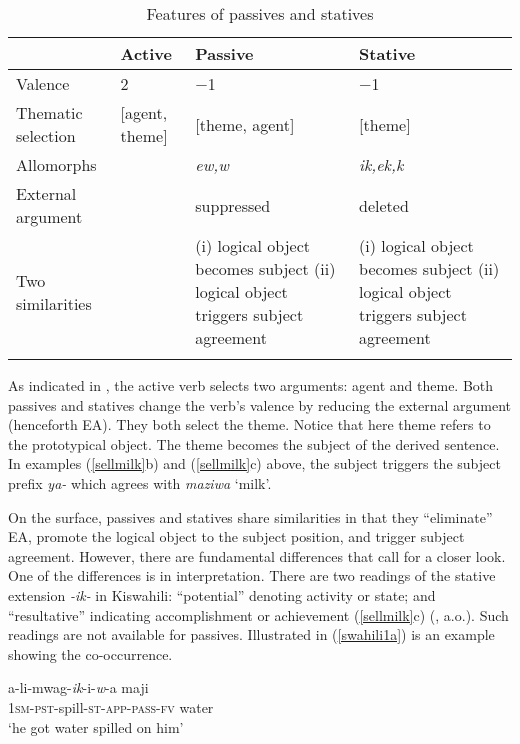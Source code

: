 \documentclass[output=paper]{langscibook}
\begin{document}
\begin{table}
\begin{tabularx}{\textwidth}{l QQQ}
 \lsptoprule
  & Active & Passive & Stative\\
\midrule
 Valence & 2 & −1 & −1\\
  Thematic selection & [agent, theme]  & [theme, agent] & [theme]\\
 Allomorphs   &   &\textit{ew,w} & \textit{ik,ek,k}\\
 External argument &  & suppressed & deleted\\
 Two similarities   &  & (i) logical object becomes subject   (ii) logical object triggers subject agreement & (i) logical object becomes subject   (ii) logical object triggers subject agreement\\
  \lspbottomrule
 \end{tabularx}
    \caption{Features of passives and statives\label{con_ngo:table1}}
\end{table}

As indicated in , the active verb selects two arguments: agent and theme. Both passives and statives change the verb's valence by reducing the external argument (henceforth EA). They both select the theme. Notice that here theme refers to the prototypical object. The theme becomes the subject of the derived sentence. In examples (\ref{sellmilk}b) and (\ref{sellmilk}c) above, the subject triggers the subject prefix \textit{ya-} which agrees with \textit{maziwa} `milk’.  

On the surface, passives and statives share similarities in that they “eliminate” EA, promote the logical object to the subject position, and trigger subject agreement. However, there are fundamental differences that call for a closer look. One of the differences is in interpretation. There are two readings of the stative extension \textit{-ik-} in Kiswahili: “potential” denoting activity or state; and “resultative” indicating accomplishment or achievement (\ref{sellmilk}c) (\citealt{Simango:2009aa,Levin:1993aa,vendler67}, a.o.). Such readings are not available for passives. Illustrated in (\ref{swahili1a}) is an example showing the co-occurrence.

\begin{exe}
\ex\label{swahili1a}
\gll a-li-mwag-\textit{ik}-i-\textit{w}-a   maji\\
\textsc{1sm-pst}-spill-\textsc{st-app-pass-fv}  water\\
\glt `he got water spilled on him'
\end{exe}
\end{document}
